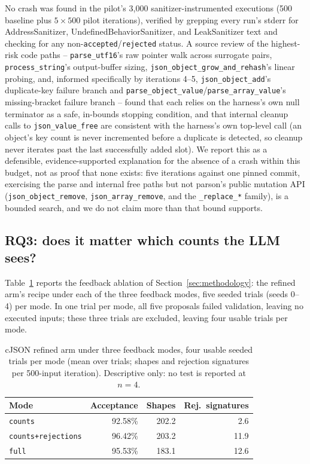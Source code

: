 No crash was found in the pilot's 3{,}000 sanitizer-instrumented
executions (500 baseline plus $5 \times 500$ pilot iterations), verified
by grepping every run's stderr for AddressSanitizer, UndefinedBehaviorSanitizer,
and LeakSanitizer text and checking for any non-\texttt{accepted}/\texttt{rejected}
status. A source review of the highest-risk code paths -- \texttt{parse\_utf16}'s
raw pointer walk across surrogate pairs, \texttt{process\_string}'s
output-buffer sizing, \texttt{json\_object\_grow\_and\_rehash}'s linear
probing, and, informed specifically by iterations 4--5, \texttt{json\_object\_add}'s
duplicate-key failure branch and \texttt{parse\_object\_value}/\texttt{parse\_array\_value}'s
missing-bracket failure branch -- found that each relies on the harness's own
null terminator as a safe, in-bounds stopping condition, and that internal
cleanup calls to \texttt{json\_value\_free} are consistent with the harness's
own top-level call (an object's key count is never incremented before a
duplicate is detected, so cleanup never iterates past the last successfully
added slot). We report this as a defensible, evidence-supported explanation
for the absence of a crash within this budget, not as proof that none
exists: five iterations against one pinned commit, exercising the parse and
internal free paths but not parson's public mutation API
(\texttt{json\_object\_remove}, \texttt{json\_array\_remove}, and the
\texttt{\_replace\_*} family), is a bounded search, and we do not claim more
than that bound supports.

\subsection{RQ3: does it matter which counts the LLM sees?}
\label{sec:evaluation-ablation}

Table~\ref{tab:ablation} reports the feedback ablation of
Section~\ref{sec:methodology}: the refined arm's recipe under each of the
three feedback modes, five seeded trials (seeds 0--4) per mode. In one trial
per mode, all five proposals failed validation, leaving no executed inputs;
these three trials are excluded, leaving four usable trials per mode.

\begin{table}[t]
\centering
\footnotesize
\caption{cJSON refined arm under three feedback modes, four usable seeded
trials per mode (mean over trials; shapes and rejection signatures per
500-input iteration). Descriptive only: no test is reported at $n{=}4$.}
\label{tab:ablation}
\setlength{\tabcolsep}{4pt}
\begin{tabular}{@{}lrrr@{}}
\toprule
Mode & Acceptance & Shapes & Rej.\ signatures \\
\midrule
\texttt{counts} & 92.58\% & 202.2 & 2.6 \\
\texttt{counts+rejections} & 96.42\% & 203.2 & 11.9 \\
\texttt{full} & 95.53\% & 183.1 & 12.6 \\
\bottomrule
\end{tabular}
\end{table}

